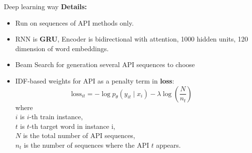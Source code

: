 \documentclass[10pt,aspectratio=1610]{beamer}
\begin{document}
\begin{frame}{Deep learning way}
  \textbf{Details:} 
  \begin{itemize}
    \item Run on sequences of API methods only.
    \item RNN is \textbf{GRU}, Encoder is bidirectional with attention, 1000 hidden units, 120 dimension of word embeddings.
    \item Beam Search for generation several API sequences to choose
    \pause
    \item IDF-based weights for API as a penalty term in \textbf{loss}:
    $$
      \mathrm{loss}_{it} = - \log p_\theta (y_{it} \mid x_i) - \lambda \log(\dfrac{N}{n_{t}})
    $$
    where\\
    \quad $i$ is $i$-th train instance,\\
    \quad $t$ is $t$-th target word in instance i,\\
    \quad $N$ is the total number of API sequences,\\
    \quad $n_t$ is the number of sequences where the API $t$ appears.\\

  \end{itemize}
\end{frame}
\end{document}
